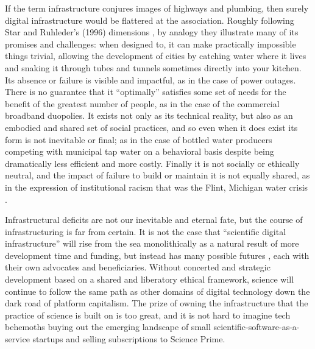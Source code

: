 If the term infrastructure conjures images of highways and plumbing,
then surely digital infrastructure would be flattered at the
association. Roughly following Star and Ruhleder's (1996) dimensions
\citep{starStepsEcologyInfrastructure1996} , by analogy they
illustrate many of its promises and challenges: when designed to, it can
make practically impossible things trivial, allowing the development of
cities by catching water where it lives and snaking it through tubes and
tunnels sometimes directly into your kitchen. Its absence or failure is
visible and impactful, as in the case of power outages. There is no
guarantee that it ``optimally'' satisfies some set of needs for the
benefit of the greatest number of people, as in the case of the
commercial broadband duopolies. It exists not only as its technical
reality, but also as an embodied and shared set of social practices, and
so even when it does exist its form is not inevitable or final; as in
the case of bottled water producers competing with municipal tap water
on a behavioral basis despite being dramatically less efficient and more
costly. Finally it is not socially or ethically neutral, and the impact
of failure to build or maintain it is not equally shared, as in the
expression of institutional racism that was the Flint, Michigan water
crisis \citep{michicancivilrightscommissionFlintWaterCrisis2017} .

Infrastructural deficits are not our inevitable and eternal fate, but
the course of infrastructuring is far from certain. It is not the case
that ``scientific digital infrastructure'' will rise from the sea
monolithically as a natural result of more development time and funding,
but instead has many possible futures\citep{mirowskiFutureOpenScience2018} , each with their own advocates and
beneficiaries. Without concerted and strategic development based on a
shared and liberatory ethical framework, science will continue to follow
the same path as other domains of digital technology down the dark road
of platform capitalism. The prize of owning the infrastructure that the
practice of science is built on is too great, and it is not hard to
imagine tech behemoths buying out the emerging landscape of small
scientific-software-as-a-service startups and selling subscriptions to
Science Prime.

